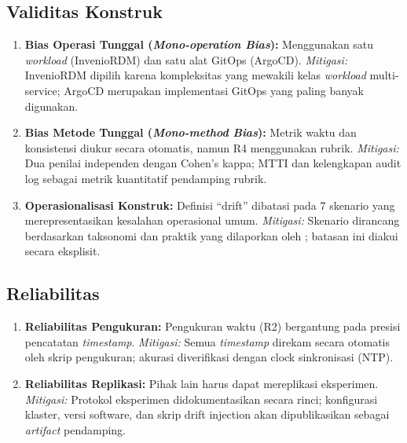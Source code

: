 \subsection{Validitas Konstruk}

\begin{enumerate}
    \item \textbf{Bias Operasi Tunggal (\textit{Mono-operation Bias}):} Menggunakan satu \textit{workload} (InvenioRDM) dan satu alat GitOps (ArgoCD). \textit{Mitigasi:} InvenioRDM dipilih karena kompleksitas yang mewakili kelas \textit{workload} multi-service; ArgoCD merupakan implementasi GitOps yang paling banyak digunakan.
    
    \item \textbf{Bias Metode Tunggal (\textit{Mono-method Bias}):} Metrik waktu dan konsistensi diukur secara otomatis, namun R4 menggunakan rubrik. \textit{Mitigasi:} Dua penilai independen dengan Cohen's kappa; MTTI dan kelengkapan audit log sebagai metrik kuantitatif pendamping rubrik.
    
    \item \textbf{Operasionalisasi Konstruk:} Definisi ``drift'' dibatasi pada 7 skenario yang merepresentasikan kesalahan operasional umum. \textit{Mitigasi:} Skenario dirancang berdasarkan taksonomi \citet{zhang2026configuration} dan praktik yang dilaporkan oleh \citet{pohjola2025mitigating}; batasan ini diakui secara eksplisit.
\end{enumerate}

\subsection{Reliabilitas}

\begin{enumerate}
    \item \textbf{Reliabilitas Pengukuran:} Pengukuran waktu (R2) bergantung pada presisi pencatatan \textit{timestamp}. \textit{Mitigasi:} Semua \textit{timestamp} direkam secara otomatis oleh skrip pengukuran; akurasi diverifikasi dengan clock sinkronisasi (NTP).
    
    \item \textbf{Reliabilitas Replikasi:} Pihak lain harus dapat mereplikasi eksperimen. \textit{Mitigasi:} Protokol eksperimen didokumentasikan secara rinci; konfigurasi klaster, versi software, dan skrip drift injection akan dipublikasikan sebagai \textit{artifact} pendamping.
\end{enumerate}